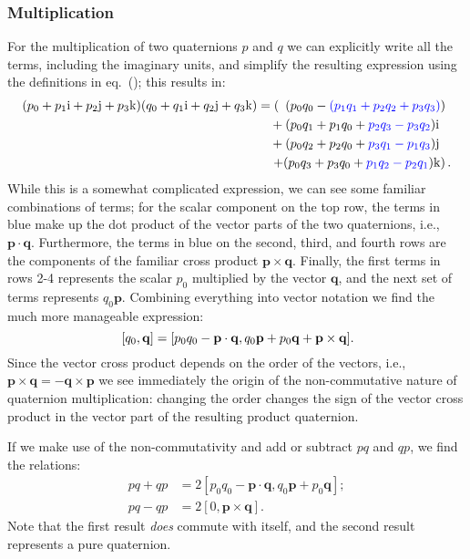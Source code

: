 \subsubsection{Multiplication}
For the multiplication of two quaternions $p$ and $q$ we can explicitly write all the terms, including the imaginary units, and simplify the resulting expression using the definitions in eq.~(); this results in:
\begin{equation}
\begin{split}
	(p_0 + p_1\mathrm{i}+p_2\mathrm{j}+p_3\mathrm{k})(q_0 + q_1\mathrm{i}+q_2\mathrm{j}+q_3\mathrm{k}) &= \left(\,\,\,  (p_0q_0 - {\color{blue}(p_1q_1+ p_2q_2 + p_3q_3)}) \right.\\
&\quad+(p_0q_1 + p_1q_0 + {\color{blue}p_2q_3 - p_3q_2})\mathrm{i}\\ 
&\quad+(p_0q_2 + p_2q_0 + {\color{blue}p_3q_1 - p_1q_3})\mathrm{j}\\ 
&\quad\left.+(p_0q_3 + p_3q_0 + {\color{blue}p_1q_2 - p_2q_1})\mathrm{k} \right).
\end{split}
\end{equation}
While this is a somewhat complicated expression, we can see some familiar combinations of terms; for the scalar component on the top row, the terms in blue make up the dot product of the vector parts of the two quaternions, i.e., $\mathbf{p}\cdot\mathbf{q}$. Furthermore, the terms in blue on the second, third, and fourth rows are the components of the familiar cross product $\mathbf{p}\times\mathbf{q}$.  Finally, the first terms in rows 2-4 represents the scalar $p_0$ multiplied by the vector $\mathbf{q}$, and the next set of terms represents $q_0\mathbf{p}$.  Combining everything into vector notation we find the much more manageable expression:
\begin{equation}
	[p_0,\mathbf{p}]\,[q_0,\mathbf{q}] = [ p_0q_0-\mathbf{p}\cdot\mathbf{q}, q_0\mathbf{p}+p_0\mathbf{q}+\mathbf{p}\times\mathbf{q} ].\OClabel{eq:qmult}
\end{equation}
Since the vector cross product depends on the order of the vectors, i.e., $\mathbf{p}\times\mathbf{q}=-\mathbf{q}\times\mathbf{p}$ we see immediately the origin of the non-commutative nature of quaternion multiplication: changing the order changes the sign of the vector cross product in the vector part of the resulting product quaternion.

If we make use of the non-commutativity and add or subtract $pq$ and $qp$, we find the relations:
\begin{equation}
\begin{split}
	pq+qp &= 2[ p_0q_0-\mathbf{p}\cdot\mathbf{q}, q_0\mathbf{p}+p_0\mathbf{q}];\\
	pq-qp &= 2[0,\mathbf{p}\times\mathbf{q}].
\end{split}
\end{equation}
Note that the first result \textit{does} commute with itself, and the second result represents a pure quaternion.

